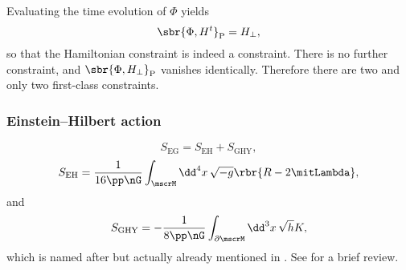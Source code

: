 \documentclass[a4paper,11pt]{article}
\begin{document}
Evaluating the time evolution of $\Phi$ yields
\begin{equation}
\sbr{\Phi,H^t}_\text{P} = H_\perp,
\end{equation}
so that the Hamiltonian constraint is indeed a constraint. There is no further 
constraint, and $\sbr{\Phi, H_\perp}_\text{P}$ vanishes identically. Therefore 
there are two and only two first-class constraints.





\subsubsection{Einstein--Hilbert action}

\begin{equation}
S_\text{EG} = S_\text{EH} + S_\text{GHY},
\label{eq:action-einstein-gravity}
\end{equation}
\begin{equation}
S_\text{EH} = \frac{1}{16\pp\nG}\int_\mscrM\dd^4 x\,\sqrt{-g} 
\rbr{R-2\mitLambda},
\end{equation}
and
\begin{equation}
S_\text{GHY} = -\frac{1}{8\pp\nG}\int_{\partial\mscrM}\dd^3 x\,\sqrt{h} K,
\end{equation}
which is named after \cite{Gibbons1977,York1972} but actually already mentioned 
in \cite{Einstein1916}. See \cite{Dyer2009} for a brief review.


\printbibliography
\end{document}
